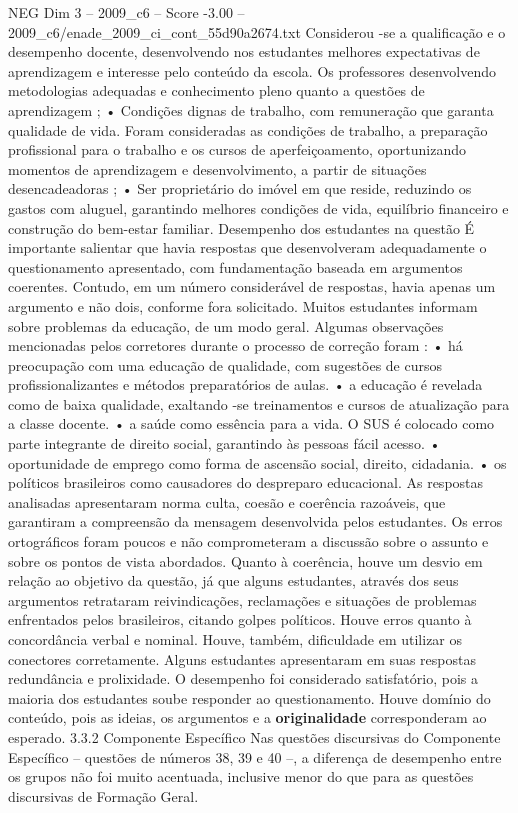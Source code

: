 \begin{textsample}{NEG Dim 3 – 2009\_c6 – Score -3.00 – 2009\_c6/enade\_2009\_ci\_cont\_55d90a2674.txt}
Considerou -se a qualificação e o desempenho docente, desenvolvendo nos estudantes melhores expectativas de aprendizagem e interesse pelo conteúdo da escola.
Os professores desenvolvendo metodologias adequadas e conhecimento pleno quanto a questões de aprendizagem ; • Condições dignas de trabalho, com remuneração que garanta qualidade de vida.
Foram consideradas as condições de trabalho, a preparação profissional para o trabalho e os cursos de aperfeiçoamento, oportunizando momentos de aprendizagem e desenvolvimento, a partir de situações desencadeadoras ; • Ser proprietário do imóvel em que reside, reduzindo os gastos com aluguel, garantindo melhores condições de vida, equilíbrio financeiro e construção do bem-estar familiar.
Desempenho dos estudantes na questão É importante salientar que havia respostas que desenvolveram adequadamente o questionamento apresentado, com fundamentação baseada em argumentos coerentes.
Contudo, em um número considerável de respostas, havia apenas um argumento e não dois, conforme fora solicitado.
Muitos estudantes informam sobre problemas da educação, de um modo geral.
Algumas observações mencionadas pelos corretores durante o processo de correção foram : • há preocupação com uma educação de qualidade, com sugestões de cursos profissionalizantes e métodos preparatórios de aulas. • a educação é revelada como de baixa qualidade, exaltando -se treinamentos e cursos de atualização para a classe docente. • a saúde como essência para a vida.
O SUS é colocado como parte integrante de direito social, garantindo às pessoas fácil acesso. • oportunidade de emprego como forma de ascensão social, direito, cidadania. • os políticos brasileiros como causadores do despreparo educacional.
As respostas analisadas apresentaram norma culta, coesão e coerência razoáveis, que garantiram a compreensão da mensagem desenvolvida pelos estudantes.
Os erros ortográficos foram poucos e não comprometeram a discussão sobre o assunto e sobre os pontos de vista abordados.
Quanto à coerência, houve um desvio em relação ao objetivo da questão, já que alguns estudantes, através dos seus argumentos retrataram reivindicações, reclamações e situações de problemas enfrentados pelos brasileiros, citando golpes políticos.
Houve erros quanto à concordância verbal e nominal.
Houve, também, dificuldade em utilizar os conectores corretamente.
Alguns estudantes apresentaram em suas respostas redundância e prolixidade.
O desempenho foi considerado satisfatório, pois a maioria dos estudantes soube responder ao questionamento.
Houve domínio do conteúdo, pois as ideias, os argumentos e a \textbf{originalidade} corresponderam ao esperado. 3.3.2 Componente Específico Nas questões discursivas do Componente Específico – questões de números 38, 39 e 40 –, a diferença de desempenho entre os grupos não foi muito acentuada, inclusive menor do que para as questões discursivas de Formação Geral.

\end{textsample}
